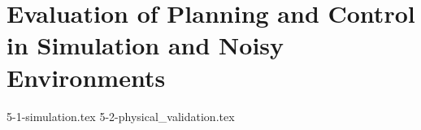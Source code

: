 \section{Evaluation of Planning and Control in Simulation and Noisy Environments}

{5-1-simulation.tex}
{5-2-physical_validation.tex}
